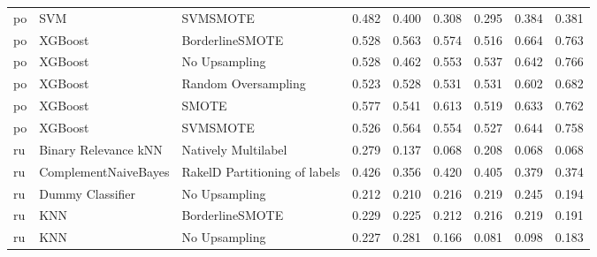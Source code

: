\begin{tabular}{lllllllll}
      po &                             SVM &                      SVMSMOTE & 0.482 &                     0.400 &                 0.308 &                  0.295 &                                   0.384 &     0.381 \\
      po &                         XGBoost &               BorderlineSMOTE & 0.528 &                     0.563 &                 0.574 &                  0.516 &                                   0.664 &     0.763 \\
      po &                         XGBoost &                 No Upsampling & 0.528 &                     0.462 &                 0.553 &                  0.537 &                                   0.642 &     0.766 \\
      po &                         XGBoost &           Random Oversampling & 0.523 &                     0.528 &                 0.531 &                  0.531 &                                   0.602 &     0.682 \\
      po &                         XGBoost &                         SMOTE & 0.577 &                     0.541 &                 0.613 &                  0.519 &                                   0.633 &     0.762 \\
      po &                         XGBoost &                      SVMSMOTE & 0.526 &                     0.564 &                 0.554 &                  0.527 &                                   0.644 &     0.758 \\
      ru &            Binary Relevance kNN &           Natively Multilabel & 0.279 &                     0.137 &                 0.068 &                  0.208 &                                   0.068 &     0.068 \\
      ru &            ComplementNaiveBayes & RakelD Partitioning of labels & 0.426 &                     0.356 &                 0.420 &                  0.405 &                                   0.379 &     0.374 \\
      ru &                Dummy Classifier &                 No Upsampling & 0.212 &                     0.210 &                 0.216 &                  0.219 &                                   0.245 &     0.194 \\
      ru &                             KNN &               BorderlineSMOTE & 0.229 &                     0.225 &                 0.212 &                  0.216 &                                   0.219 &     0.191 \\
      ru &                             KNN &                 No Upsampling & 0.227 &                     0.281 &                 0.166 &                  0.081 &                                   0.098 &     0.183 \\

\end{tabular}
